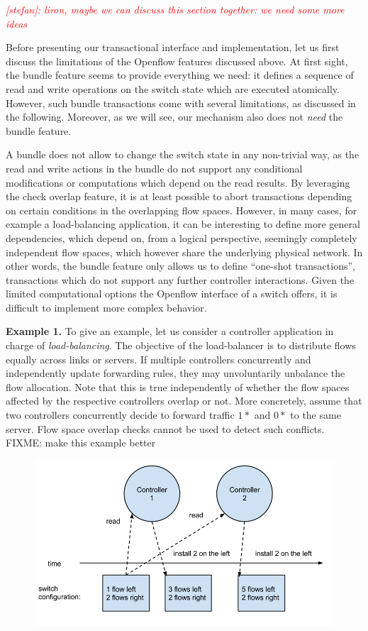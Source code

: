 \documentclass[conference]{sigcomm-alternate}
\newcommand{\stefan}[1]{\textit{\textcolor{red}{[stefan]: #1}}} %
\begin{document}
\stefan{liron, maybe we can discuss this section together: we need some more ideas}

Before presenting our transactional interface and implementation,
let us first discuss the limitations of the Openflow features discussed above.
At first sight, the bundle feature seems to provide everything
we need: it defines a sequence of read and write operations
 on the switch state which are executed atomically.
 However, such bundle transactions come with several
 limitations, as discussed in the following. Moreover,
 as we will see, our mechanism also does not \emph{need}
 the bundle feature. 

A bundle does not allow
 to change the switch state in any non-trivial way,
 as the read and write actions in the bundle do
 not support any conditional modifications or computations which
 depend on the read results. By leveraging
 the check overlap feature, it is at least possible
 to abort transactions depending on certain conditions
 in the overlapping
 flow spaces. However, in many cases, for example
 a load-balancing application,
 it can be interesting to define more general
 dependencies, which depend on, from a logical perspective,
 seemingly
 completely independent flow spaces,
 which however share the underlying physical network.
In other words, the bundle feature only allows us to
define ``one-shot transactions'',
transactions which do not support any further controller interactions.
Given
the limited computational options the Openflow interface of a switch offers,
it is difficult to implement more complex behavior.

\textbf{Example 1.} To give an example, let us consider a controller application in charge
of \emph{load-balancing}. The objective of the load-balancer
is to distribute flows equally across links or servers.
If multiple controllers concurrently and independently
update forwarding rules, they may unvoluntarily
unbalance the flow allocation. Note that this
is true independently of whether the flow spaces
affected by the respective controllers overlap or not.
More concretely, assume that two controllers concurrently
decide to forward traffic $1*$ and $0*$ to the same server.
Flow space overlap checks cannot be used to detect
such conflicts.
FIXME: make this example better


\begin{figure}[ht]
\centering
\includegraphics[width=1\columnwidth]{no-sync.png}\\
\caption{}\label{fig:no-sync}
\end{figure}
\end{document}
